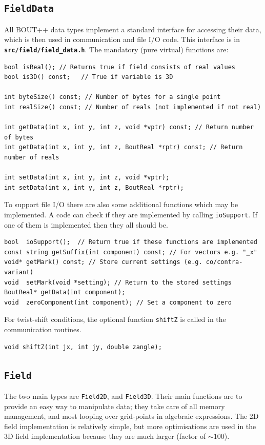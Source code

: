 \documentclass[12pt]{article}
\newcommand{\code}[1]{\texttt{#1}}
\newcommand{\file}[1]{\texttt{\bf #1}}
\begin{document}
\subsection{\code{FieldData}}
All BOUT++ data types implement a standard interface for accessing their
data, which is then used in communication and file I/O code. This interface
is in \file{src/field/field\_data.h}. The mandatory (pure virtual) functions are:
\begin{lstlisting}
bool isReal(); // Returns true if field consists of real values
bool is3D() const;   // True if variable is 3D
  
int byteSize() const; // Number of bytes for a single point
int realSize() const; // Number of reals (not implemented if not real)
  
int getData(int x, int y, int z, void *vptr) const; // Return number of bytes
int getData(int x, int y, int z, BoutReal *rptr) const; // Return number of reals
  
int setData(int x, int y, int z, void *vptr);
int setData(int x, int y, int z, BoutReal *rptr);
\end{lstlisting}

To support file I/O there are also some additional functions which may be implemented.
A code can check if they are implemented by calling \code{ioSupport}. If one of them
is implemented then they all should be.
\begin{lstlisting}
bool  ioSupport();  // Return true if these functions are implemented
const string getSuffix(int component) const; // For vectors e.g. "_x"
void* getMark() const; // Store current settings (e.g. co/contra-variant)
void  setMark(void *setting); // Return to the stored settings
BoutReal* getData(int component); 
void  zeroComponent(int component); // Set a component to zero
\end{lstlisting}  

For twist-shift conditions, the optional function \code{shiftZ} is called in the communication
routines.
\begin{lstlisting}
void shiftZ(int jx, int jy, double zangle);
\end{lstlisting}

\subsection{\code{Field}}
The two main types are \code{Field2D}, and \code{Field3D}. Their main functions
are to provide an easy way to manipulate data; they take care of all memory management,
and most looping over grid-points in algebraic expressions. The 2D field implementation
is relatively simple, but more optimisations are used in the 3D field implementation
because they are much larger (factor of $\sim 100$).
\end{document}
